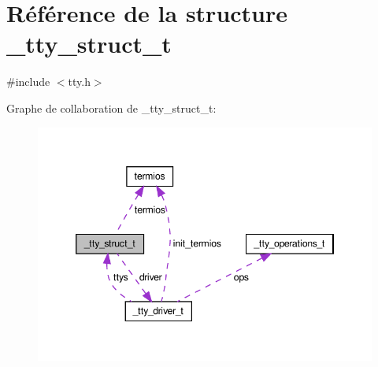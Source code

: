 \hypertarget{struct__tty__struct__t}{\section{Référence de la structure \-\_\-tty\-\_\-struct\-\_\-t}
\label{struct__tty__struct__t}
}


{\ttfamily \#include $<$tty.\-h$>$}



Graphe de collaboration de \-\_\-tty\-\_\-struct\-\_\-t\-:\nopagebreak
\begin{figure}[H]
\begin{center}
\leavevmode
\includegraphics[width=346pt]{struct__tty__struct__t__coll__graph}
\end{center}
\end{figure}
